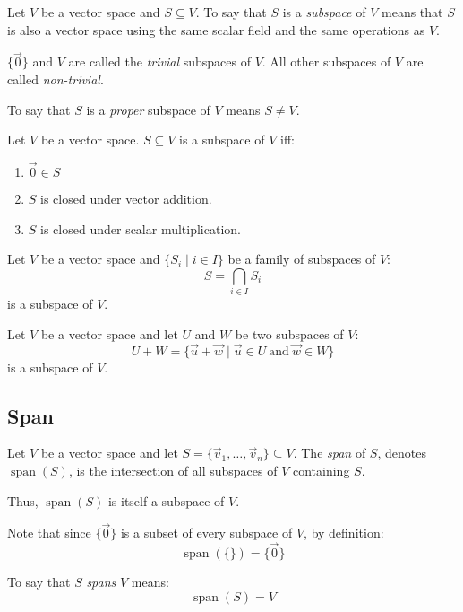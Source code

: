 \documentclass[letterpaper,12pt,fleqn]{article}
\DeclareMathOperator{\spn}{span}
\newcommand{\vu}{\vec{u}}
\newcommand{\vv}{\vec{v}}
\newcommand{\vw}{\vec{w}}
\newcommand{\vz}{\vec{0}}
\begin{document}
\begin{definition}[Subspace]
  Let $V$ be a vector space and $S\subseteq V$. To say that $S$ is a \emph{subspace} of
  $V$ means that $S$ is also a vector space using the same scalar field and the same
  operations as $V$.

  $\{\vz\}$ and $V$ are called the \emph{trivial} subspaces of $V$. All other subspaces
  of $V$ are called \emph{non-trivial}.

  To say that $S$ is a \emph{proper} subspace of $V$ means $S\ne V$.
\end{definition}

\begin{theorem}
  Let $V$ be a vector space. $S\subseteq V$ is a subspace of $V$ iff:
  \begin{enumerate}
  \item $\vz\in S$
  \item $S$ is closed under vector addition.
  \item $S$ is closed under scalar multiplication.
  \end{enumerate}
\end{theorem}

\begin{theorem}
  Let $V$ be a vector space and $\{S_i\mid i\in I\}$ be a family of subspaces of $V$:
  \[S=\bigcap_{i\in I}S_i\]
  is a subspace of $V$.
\end{theorem}

\begin{theorem}
  Let $V$ be a vector space and let $U$ and $W$ be two subspaces of $V$:
  \[U+W=\{\vu+\vw\mid\vu\in U\ \mbox{and}\ \vw\in W\}\]
  is a subspace of $V$.
\end{theorem}

\newpage

\subsection*{Span}

\begin{definition}[Span]
  Let $V$ be a vector space and let $S=\{\vv_1,\ldots,\vv_n\}\subseteq V$. The
  \emph{span} of $S$, denotes $\spn(S)$, is the intersection of all subspaces of $V$
  containing $S$.

  Thus, $\spn(S)$ is itself a subspace of $V$.

  Note that since $\{\vz\}$ is a subset of every subspace of $V$, by definition:
  \[\spn(\{\})=\{\vz\}\]

  To say that $S$ \emph{spans} $V$ means:
  \[\spn(S)=V\]
\end{definition}
\end{document}
